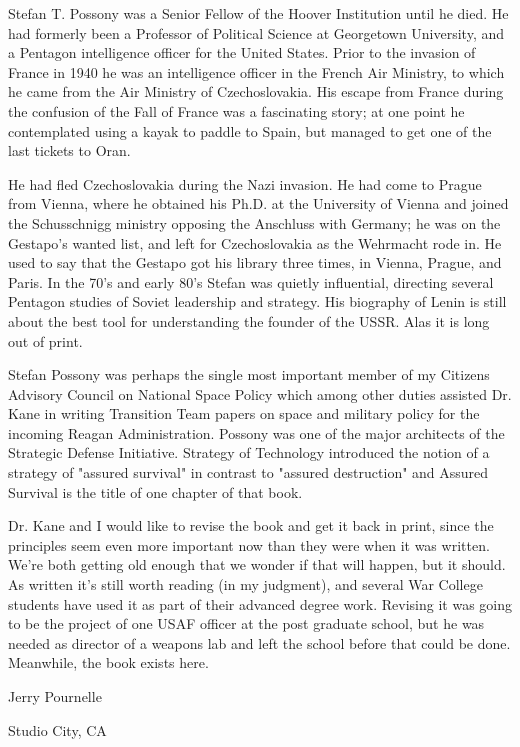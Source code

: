 Stefan T. Possony was a Senior Fellow of the Hoover Institution until he died. He had formerly been a Professor of Political Science at Georgetown University, and a Pentagon intelligence officer for the United States. Prior to the invasion of France in 1940 he was an intelligence officer in the French Air Ministry, to which he came from the Air Ministry of Czechoslovakia. His escape from France during the confusion of the Fall of France was a fascinating story; at one point he contemplated using a kayak to paddle to Spain, but managed to get one of the last tickets to Oran.

He had fled Czechoslovakia during the Nazi invasion. He had come to Prague from Vienna, where he obtained his Ph.D. at the University of Vienna and joined the Schusschnigg ministry opposing the Anschluss with Germany; he was on the Gestapo's wanted list, and left for Czechoslovakia as the Wehrmacht rode in. He used to say that the Gestapo got his library three times, in Vienna, Prague, and Paris. In the 70's and early 80's Stefan was quietly influential, directing several Pentagon studies of Soviet leadership and strategy. His biography of Lenin is still about the best tool for understanding the founder of the USSR. Alas it is long out of print.

Stefan Possony was perhaps the single most important member of my Citizens Advisory Council on National Space Policy which among other duties assisted Dr. Kane in writing Transition Team papers on space and military policy for the incoming Reagan Administration. Possony was one of the major architects of the Strategic Defense Initiative. Strategy of Technology introduced the notion of a strategy of "assured survival" in contrast to "assured destruction" and Assured Survival is the title of one chapter of that book.

Dr. Kane and I would like to revise the book and get it back in print, since the principles seem even more important now than they were when it was written. We're both getting old enough that we wonder if that will happen, but it should. As written it's still worth reading (in my judgment), and several War College students have used it as part of their advanced degree work. Revising it was going to be the project of one USAF officer at the post graduate school, but he was needed as director of a weapons lab and left the school before that could be done. Meanwhile, the book exists here.

Jerry Pournelle

Studio City, CA

